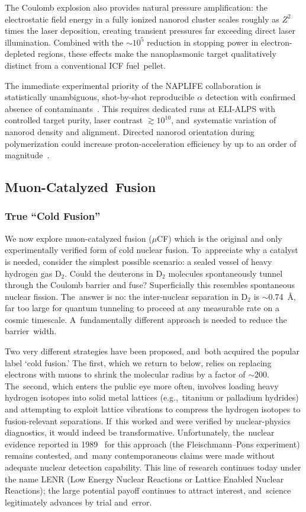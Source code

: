\documentclass[particles,article,accept,pdftex,moreauthors]{Definitions/mdpi}
\begin{document}
The Coulomb explosion also provides natural pressure amplification: the electrostatic field energy in a fully ionized nanorod cluster scales roughly as $Z^2$ times the laser deposition, creating transient pressures far exceeding direct laser illumination. Combined with the ${\sim}10^5$ reduction in stopping power in electron-depleted regions, these effects make the nanoplasmonic target qualitatively distinct from a conventional ICF fuel~pellet.

The immediate experimental priority of the NAPLIFE collaboration is statistically unambiguous, shot-by-shot reproducible $\alpha$ detection with confirmed absence of contaminants~\cite{mcnamee2025contaminant}. This requires dedicated runs at ELI-ALPS with controlled target purity, laser contrast ${\gtrsim}10^{10}$, and~systematic variation of nanorod density and alignment. Directed nanorod orientation during polymerization could increase proton-acceleration efficiency by up to an order of magnitude~\cite{Kedves:2025EPJ}.

\subsection{Muon-Catalyzed~Fusion}\label{ssec:MuonCatalyzed}
\subsubsection{True ``Cold Fusion''}\label{sssec:CF}
We now explore muon-catalyzed fusion ($\mu$CF) which is the original and only experimentally verified form of cold nuclear fusion. To~appreciate why a catalyst is needed, consider the simplest possible scenario: a sealed vessel of heavy hydrogen gas D$_2$. Could the deuterons in D$_2$ molecules spontaneously tunnel through the Coulomb barrier and fuse? Superficially this resembles spontaneous nuclear fission. The~answer is no: the inter-nuclear separation in D$_2$ is $\sim$0.74~\AA, far too large for quantum tunneling to proceed at any measurable rate on a cosmic timescale. A~fundamentally different approach is needed to reduce the barrier~width.

Two very different strategies have been proposed, and~both acquired the popular label `cold fusion.' The first, which we return to below, relies on replacing electrons with muons to shrink the molecular radius by a factor of $\sim$200. The~second, which enters the public eye more often, involves loading heavy hydrogen isotopes into solid metal lattices (e.g.,\ titanium or palladium hydrides) and attempting to exploit lattice vibrations to compress the hydrogen isotopes to fusion-relevant separations. If~this worked and were verified by nuclear-physics diagnostics, it would indeed be transformative. Unfortunately, the~nuclear evidence reported in 1989~\cite{Jones:1989dv} for this approach (the Fleischmann--Pons experiment) remains contested, and~many contemporaneous claims were made without adequate nuclear detection capability. This line of research continues today under the name LENR (Low Energy Nuclear Reactions or Lattice Enabled Nuclear Reactions); the large potential payoff continues to attract interest, and~science legitimately advances by trial and~error.
\end{document}
